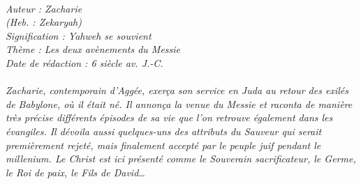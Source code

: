 \BFont
\noindent\hrulefill
{\footnotesize
\textit{
\bigskip
{\centering{}
\\Auteur : Zacharie
\\(Heb. : Zekaryah)
\\Signification : Yahweh se souvient
\\Thème : Les deux avènements du Messie
\\Date de rédaction : 6 siècle av. J.-C.\\}
}
\textit{
\\Zacharie, contemporain d'Aggée, exerça son service en Juda au retour des exilés de Babylone, où il était né. Il annonça la venue du Messie et raconta de manière très précise différents épisodes de sa vie que l'on retrouve également dans les évangiles. Il dévoila aussi quelques-uns des attributs du Sauveur qui serait premièrement rejeté, mais finalement accepté par le peuple juif pendant le millenium. Le Christ est ici présenté comme le Souverain sacrificateur, le Germe, le Roi de paix, le Fils de David…\bigskip
}
}
\par\nobreak\noindent\hrulefill
